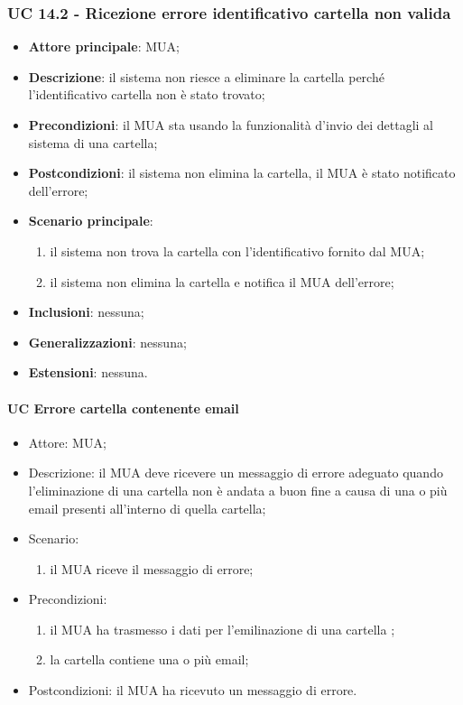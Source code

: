 \subsubsection{UC 14.2 - Ricezione errore identificativo cartella non valida} \label{sec:UC11.2}
    \begin{itemize}
        \item \textbf{Attore principale}: MUA;
        \item \textbf{Descrizione}: il sistema non riesce a eliminare la cartella perché l'identificativo cartella non è stato trovato;
        \item \textbf{Precondizioni}: il MUA sta usando la funzionalità d'invio dei dettagli al sistema di una cartella;
        \item \textbf{Postcondizioni}: il sistema non elimina la cartella, il MUA è stato notificato dell'errore;
        \item \textbf{Scenario principale}:
            \begin{enumerate}
                \item il sistema non trova la cartella con l'identificativo fornito dal MUA;
                \item il sistema non elimina la cartella e notifica il MUA dell'errore;
            \end{enumerate}
        \item \textbf{Inclusioni}: nessuna;
        \item \textbf{Generalizzazioni}: nessuna;
        \item \textbf{Estensioni}: nessuna.
    \end{itemize}
   
   
    \paragraph{UC Errore cartella contenente email} \label{sec: UC 11.4.2.1}
        \begin{itemize}
                \item Attore: MUA;
                \item Descrizione: il MUA deve ricevere un messaggio di errore adeguato quando l'eliminazione di una cartella non è andata a buon fine a causa di una o più email presenti all'interno di quella cartella;
         \item Scenario:
         \begin{enumerate}
         \item il MUA riceve il messaggio di errore;
         \end{enumerate}   
         \item Precondizioni: 
         \begin{enumerate}
             \item il MUA ha trasmesso i dati per l'emilinazione di una cartella ;
             \item la cartella contiene una o più email;
         \end{enumerate}
         \item Postcondizioni: il MUA ha ricevuto un messaggio di errore.
     \end{itemize}
     
